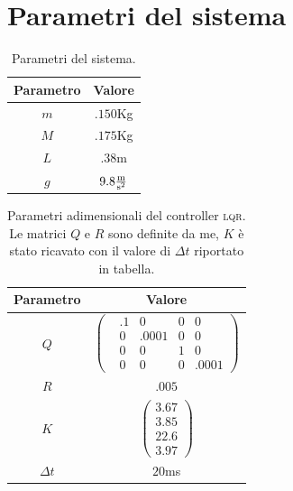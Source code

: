\appendix
\section{Parametri del sistema}\label{sec:parametri-sistema}
\begin{table}[H]
  \centering
  \begin{tabular}[t]{cc}
    \toprule
    Parametro &Valore\\
    \midrule
    $m$ & $.150$Kg \\
    $M$ & $.175$Kg \\
    $L$ & $.38$m   \\
    $g$ & $9.8\frac {\text m}{\text {s}^2}$ \\
    \bottomrule
  \end{tabular}
  \caption{
    Parametri del sistema.
  }
  \label{tab:parametri-sistema}
\end{table}

\begin{table}[H]
  \centering
  \begin{tabular}[t]{cc}
    \toprule
    Parametro &Valore\\
    \midrule
    \vspace{5px}
    $Q$ & $\left(\begin{matrix}
                   &.1 &0 &0 &0 \\ &0 &.0001 &0 &0 \\ &0 &0 &1 &0 \\ &0 &0 &0 &.0001
    \end{matrix}\right)$ \\
    \vspace{5px}
    $R$ & %
                   $.005$ \\
    \vspace{5px}
    $K$ & $\left(\begin{matrix}
                   3.67 \\ 3.85 \\ 22.6 \\ 3.97
    \end{matrix}\right)$ \\
    $\Delta t$ & $20$ms \\
    \bottomrule
  \end{tabular}
  \caption{
    Parametri adimensionali del controller \textsc{lqr}. Le matrici $Q$ e $R$ sono definite da me, $K$ è stato ricavato
    con il valore di $\Delta t$ riportato in tabella.
  }
  \label{tab:coefficienti-lqr}
\end{table}

